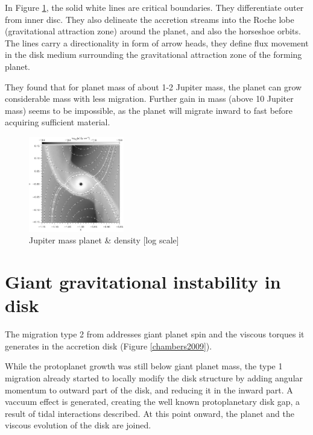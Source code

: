 \documentclass[12pt]{article} %
\begin{document}
\noindent In Figure \ref{bate2003}, the solid white lines are critical boundaries. They differentiate outer from inner disc. They also delineate the accretion streams into the Roche lobe (gravitational attraction zone) around the planet, and also the horseshoe orbits. The lines carry a directionality in form of arrow heads, they define flux movement in the disk medium surrounding the gravitational attraction zone of the forming planet. \newline

\noindent They found that for planet mass of about 1-2 Jupiter mass, the planet can grow considerable mass with less migration. Further gain in mass (above 10 Jupiter mass) seems to be impossible, as the planet will migrate inward to fast before acquiring sufficient material.

\begin{figure}
\begin{center}
 \includegraphics[width=0.37\textwidth,keepaspectratio=true]{./images/bate2003}
 \caption{Jupiter mass planet \& density \cite{bate2003three} [log scale]}
 \label{bate2003}
\end{center}
\end{figure}
\clearpage
\section{Giant gravitational instability in disk}\vspace{-2ex}\titlerule[1pt]\bigskip

The migration type 2 from \cite{chambers2009planetary} addresses giant planet spin and the viscous torques it generates in the accretion disk (Figure \ref{chambers2009}).\newline

\noindent While the protoplanet growth was still below giant planet mass, the type 1 migration already started to locally modify the disk structure by adding angular momentum to outward part of the disk, and reducing it in the inward part. A vaccuum effect is generated, creating the well known protoplanetary disk gap, a result of tidal interactions described. At this point onward, the planet and the viscous evolution of the disk are joined.
\end{document}
